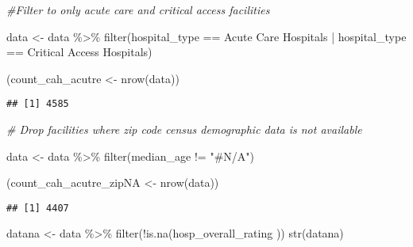 \documentclass[
]{article}
\newenvironment{Shaded}{\begin{snugshade}}{\end{snugshade}}
\newcommand{\CommentTok}[1]{\textcolor[rgb]{0.56,0.35,0.01}{\textit{#1}}}
\newcommand{\FunctionTok}[1]{\textcolor[rgb]{0.00,0.00,0.00}{#1}}
\newcommand{\NormalTok}[1]{#1}
\newcommand{\OtherTok}[1]{\textcolor[rgb]{0.56,0.35,0.01}{#1}}
\newcommand{\SpecialCharTok}[1]{\textcolor[rgb]{0.00,0.00,0.00}{#1}}
\newcommand{\StringTok}[1]{\textcolor[rgb]{0.31,0.60,0.02}{#1}}
\begin{document}
\begin{Shaded}
\begin{Highlighting}[]
\CommentTok{\#Filter to only acute care and critical access facilities}

\NormalTok{data }\OtherTok{\textless{}{-}}\NormalTok{ data }\SpecialCharTok{\%\textgreater{}\%} \FunctionTok{filter}\NormalTok{(hospital\_type }\SpecialCharTok{==} \StringTok{\textquotesingle{}Acute Care Hospitals\textquotesingle{}} \SpecialCharTok{|}\NormalTok{  hospital\_type }\SpecialCharTok{==} \StringTok{\textquotesingle{}Critical Access Hospitals\textquotesingle{}}\NormalTok{) }

\NormalTok{(count\_cah\_acutre }\OtherTok{\textless{}{-}} \FunctionTok{nrow}\NormalTok{(data))}
\end{Highlighting}
\end{Shaded}

\begin{verbatim}
## [1] 4585
\end{verbatim}

\begin{Shaded}
\begin{Highlighting}[]
\CommentTok{\# Drop facilities where zip code census demographic data is not available}

\NormalTok{data }\OtherTok{\textless{}{-}}\NormalTok{ data }\SpecialCharTok{\%\textgreater{}\%} \FunctionTok{filter}\NormalTok{(median\_age }\SpecialCharTok{!=} \StringTok{"\#N/A"}\NormalTok{) }

\NormalTok{(count\_cah\_acutre\_zipNA }\OtherTok{\textless{}{-}} \FunctionTok{nrow}\NormalTok{(data))}
\end{Highlighting}
\end{Shaded}

\begin{verbatim}
## [1] 4407
\end{verbatim}

\begin{Shaded}
\begin{Highlighting}[]
\NormalTok{datana }\OtherTok{\textless{}{-}}\NormalTok{ data }\SpecialCharTok{\%\textgreater{}\%} \FunctionTok{filter}\NormalTok{(}\SpecialCharTok{!}\FunctionTok{is.na}\NormalTok{(hosp\_overall\_rating ))}
\FunctionTok{str}\NormalTok{(datana)}
\end{Highlighting}
\end{Shaded}
\end{document}

